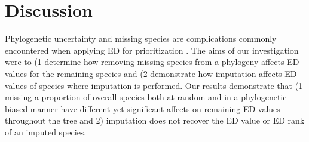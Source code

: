 \documentclass[12pt,english]{article}
\begin{document}
\section*{Discussion}
Phylogenetic uncertainty and missing species are complications commonly
encountered when applying ED for prioritization \autocite{Isaac2007}. The aims
of our investigation were to (1 determine how removing missing species from a
phylogeny affects ED values for the remaining species and (2 demonstrate how
imputation affects ED values of species where imputation is performed. Our
results demonstrate that (1 missing a proportion of overall species both at
random and in a phylogenetic-biased manner have different yet significant
affects on remaining ED values throughout the tree and 2) imputation does not
recover the ED value or ED rank of an imputed species.
\end{document}
